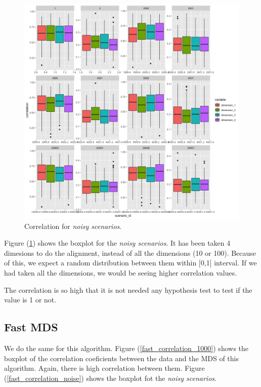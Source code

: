 \documentclass[11pt]{report}
\begin{document}
\begin{figure}[ht]
\centering
    \includegraphics{./images/divide_correlation_noise.png}
    \caption{Correlation for \textit{noisy scenarios}.}
    \label{divide_correlation_noise}
\end{figure}

\indent Figure (\ref{divide_correlation_noise}) shows the boxplot for the 
\textit{noisy scenarios}. It has been taken 4 dimesions to do the alignment, 
instead of all the dimensions (10 or 100). Because of this, we expect a random 
distribution between them within [0,1] interval. If we had taken all the 
dimensions, we would be seeing higher correlation values. 

\indent The correlation is so high that it is not needed any hypothesis test
to test if the value is 1 or not. 


\subsection{Fast MDS}
We do the same for this algorithm. Figure (\ref{fast_correlation_1000}) shows 
the boxplot of the correlation coeficients between the data and the MDS 
of this algorithm. Again, there is high correlation between them. 
Figure (\ref{fast_correlation_noise}) shows the boxplot fot the 
\textit{noisy scenarios}.
\end{document}

